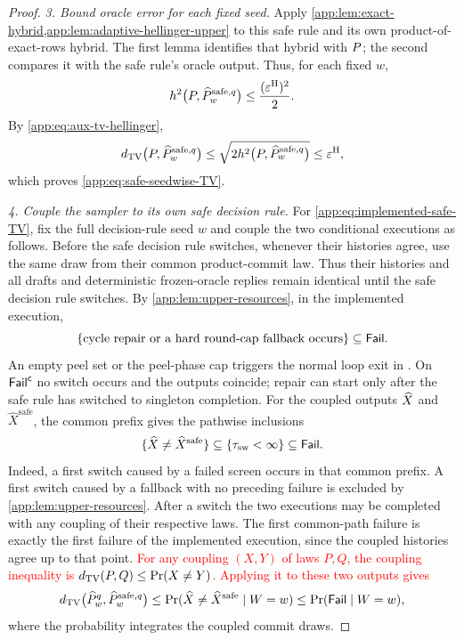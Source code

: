 \begin{proof}
\emph{3. Bound oracle error for each fixed seed.}
Apply \cref{app:lem:exact-hybrid,app:lem:adaptive-hellinger-upper}
to this safe rule and its own product-of-exact-rows hybrid.
The first lemma identifies that hybrid with $P$; the second
compares it with the safe rule's oracle output.  Thus, for each fixed $w$,
\begin{equation}
 h^2\bigl(
  P,\widehat P_{w}^{\mathrm{safe},q}
 \bigr)
 \le\frac{(\varepsilon^{\mathrm H})^2}{2}.
 \label{app:eq:safe-global-hellinger}
\end{equation}
By \eqref{app:eq:aux-tv-hellinger},
\begin{equation}
 d_{\mathrm{TV}}\bigl(P,
       \widehat P_{w}^{\mathrm{safe},q}\bigr)
 \le\sqrt{2h^2\bigl(
  P,\widehat P_{w}^{\mathrm{safe},q}
 \bigr)}
 \le\varepsilon^{\mathrm H},
\end{equation}
which proves \eqref{app:eq:safe-seedwise-TV}.


\emph{4. Couple the sampler to its own safe decision rule.}
For \eqref{app:eq:implemented-safe-TV}, fix the full decision-rule seed $w$ and couple the
two conditional executions as follows.  Before the safe decision rule switches,
whenever their histories agree, use
the same draw from their common product-commit law.  Thus their histories and
all drafts and deterministic frozen-oracle replies remain identical until the safe
decision rule switches.  By \cref{app:lem:upper-resources}, in the
implemented execution,
\[
 \{\text{cycle repair or a hard round-cap fallback occurs}\}
 \subseteq\mathsf{Fail}.
\]
An empty peel set or the peel-phase cap triggers the normal loop exit in
.  On $\mathsf{Fail}^{\mathsf c}$ no switch occurs
and the outputs coincide; repair can start only after the safe rule has
switched to singleton completion.  For the coupled outputs
$\widehat X$ and $\widehat X^{\mathrm{safe}}$, the common prefix gives
the pathwise inclusions
\[
 \{\widehat X\ne\widehat X^{\mathrm{safe}}\}
 \subseteq\{\tau_{\mathrm{sw}}<\infty\}
 \subseteq\mathsf{Fail}.
\]
Indeed, a first switch caused by a failed screen occurs in that common
prefix.  A first switch caused by a fallback with no preceding failure is
excluded by \cref{app:lem:upper-resources}.  After a switch the two
executions may be completed with any coupling of their respective laws.
The first common-path failure is exactly the first failure of the
implemented execution, since the coupled histories agree up to that point.
\textcolor{red}{For any coupling $(X,Y)$ of laws $P,Q$, the coupling inequality
is $d_{\mathrm{TV}}(P,Q)\le\Pr(X\ne Y)$.  Applying it to these two outputs gives}
{\color{red}
\begin{equation}
 d_{\mathrm{TV}}\bigl(
   \widehat P_{w}^{q},
   \widehat P_{w}^{\mathrm{safe},q}
 \bigr)
 \le
 \Pr(\widehat X\ne\widehat X^{\mathrm{safe}}
       \mid W=w)
 \le
 \Pr(\mathsf{Fail}\mid W=w),
 \label{app:eq:conditional-safe-coupling}
\end{equation}
}
where the probability integrates the coupled commit draws.


\end{proof}

